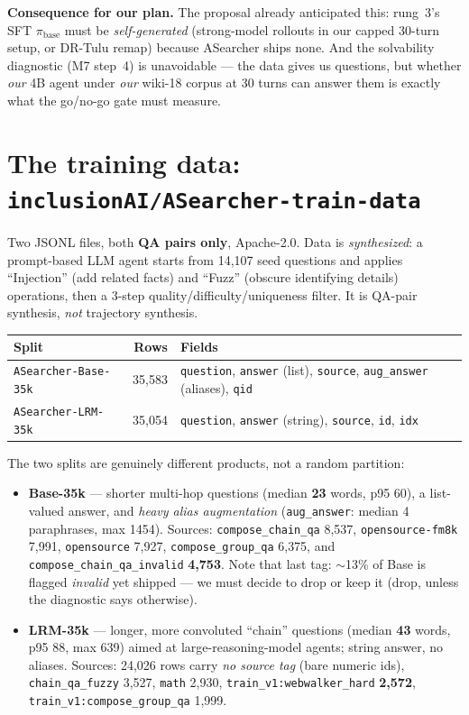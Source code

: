 \documentclass[10pt]{article}
\newcommand{\cmd}[1]{\texttt{\small #1}}
\begin{document}
\noindent\textbf{Consequence for our plan.} The proposal already anticipated this: rung~3's SFT
$\pi_\text{base}$ must be \emph{self-generated} (strong-model rollouts in our capped 30-turn setup, or
DR-Tulu remap) because ASearcher ships none. And the solvability diagnostic (M7 step~4) is unavoidable ---
the data gives us questions, but whether \emph{our} 4B agent under \emph{our} wiki-18 corpus at 30 turns
can answer them is exactly what the go/no-go gate must measure.

\section{The training data: \cmd{inclusionAI/ASearcher-train-data}}
Two JSONL files, both \textbf{QA pairs only}, Apache-2.0. Data is \emph{synthesized}: a prompt-based LLM
agent starts from 14,107 seed questions and applies ``Injection'' (add related facts) and ``Fuzz''
(obscure identifying details) operations, then a 3-step quality/difficulty/uniqueness filter. It is
QA-pair synthesis, \emph{not} trajectory synthesis.

\begin{center}\small
\begin{tabular}{lrl}
\toprule
Split & Rows & Fields \\
\midrule
\cmd{ASearcher-Base-35k} & 35{,}583 & \cmd{question}, \cmd{answer} (list), \cmd{source}, \cmd{aug\_answer} (aliases), \cmd{qid} \\
\cmd{ASearcher-LRM-35k} & 35{,}054 & \cmd{question}, \cmd{answer} (string), \cmd{source}, \cmd{id}, \cmd{idx} \\
\bottomrule
\end{tabular}
\end{center}

\noindent The two splits are genuinely different products, not a random partition:
\begin{itemize}
\item \textbf{Base-35k} --- shorter multi-hop questions (median \textbf{23} words, p95 60), a list-valued
answer, and \emph{heavy alias augmentation} (\cmd{aug\_answer}: median 4 paraphrases, max 1454). Sources:
\cmd{compose\_chain\_qa} 8{,}537, \cmd{opensource-fm8k} 7{,}991, \cmd{opensource} 7{,}927,
\cmd{compose\_group\_qa} 6{,}375, and \cmd{compose\_chain\_qa\_invalid} \textbf{4{,}753}. Note that last
tag: $\sim$13\% of Base is flagged \emph{invalid} yet shipped --- we must decide to drop or keep it (drop,
unless the diagnostic says otherwise).
\item \textbf{LRM-35k} --- longer, more convoluted ``chain'' questions (median \textbf{43} words, p95 88,
max 639) aimed at large-reasoning-model agents; string answer, no aliases. Sources: 24{,}026 rows carry
\emph{no source tag} (bare numeric ids), \cmd{chain\_qa\_fuzzy} 3{,}527, \cmd{math} 2{,}930,
\cmd{train\_v1:webwalker\_hard} \textbf{2{,}572}, \cmd{train\_v1:compose\_group\_qa} 1{,}999.
\end{itemize}
\end{document}
